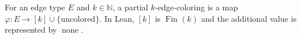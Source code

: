 \begin{definition}
For an edge type $E$ and $k\in\mathbb N$, a partial $k$-edge-coloring is a
map $\varphi:E\to [k]\cup\{\text{uncolored}\}$.  In Lean, $[k]$ is
$\operatorname{Fin}(k)$ and the additional value is represented by
$\operatorname{none}$.
\end{definition}
